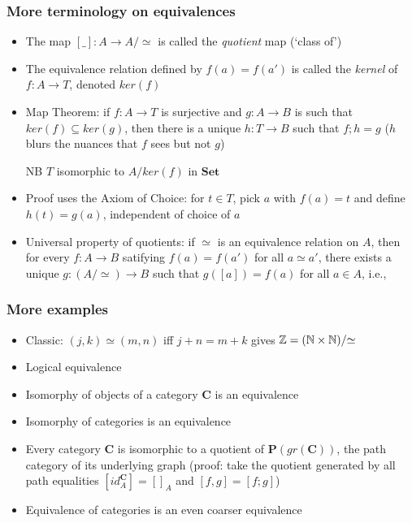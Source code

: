 \documentclass[handout]{beamer}
\newcommand{\bfsf}[1]{{\boldsymbol{#1}}}
\newcommand{\Set}{\bfsf{Set}}
\newcommand{\CC}{\bfsf{C}}
\newcommand{\PP}{\bfsf{P}}
\begin{document}
\frame
  {   
    \frametitle{More terminology on equivalences}\label{Ch4:Eqvs}

 \begin{itemize}[<+->]
\item The map $[\_] : A\to A/{\simeq}$ is called the \emph{quotient} map (`class of')
\item The equivalence relation defined by $f(a)=f(a')$  is called the \emph{kernel} of $f:A\to T$,
 denoted $ker(f)$
\item Map Theorem: if $f:A\to T$ is surjective and $g:A\to B$ is 
such that $ker(f)\subseteq ker(g)$,
then there is a unique $h: T\to B$ such that $f;h=g$ ($h$ blurs the  nuances 
that $f$ sees but not $g$)
 NB $T$ isomorphic to $A/ker(f)$ in $\Set$
\item Proof uses the Axiom of Choice: for $t\in T$, 
pick $a$ with $f(a)=t$ and define $h(t)=g(a)$, independent of choice of $a$
\item Universal property of quotients: if $\simeq$ is an equivalence relation on $A$,
then for every $f: A\to B$  satifying $f(a)=f(a')$ for all $a\simeq a'$,  there exists a unique
$g: (A/{\simeq})\to B$ such that $g([a]) = f(a)$ for all $a\in A$, i.e., 
 \end{itemize}

 }

\frame
  {   
    \frametitle{More examples}\label{Ch4:EqMorExa}

 \begin{itemize}[<+->]
\item Classic: $(j,k)\simeq(m,n)$ iff $j+n = m+k$ gives $\mathbb{Z}=(\mathbb{N}\times\mathbb{N})/{\simeq}$
\item Logical equivalence
\item Isomorphy of objects of a category $\CC$ is an equivalence
\item Isomorphy of categories is an equivalence
\item Every category $\CC$ is isomorphic to a quotient of $\PP(gr(\CC))$,
the path category of its underlying graph (proof: take the quotient generated
by all path equalities $[id^\CC_A]=[]_A$ and $[f,g] = [f;g]$)
\item Equivalence of categories is an even coarser equivalence
 \end{itemize}

 }
\end{document}
